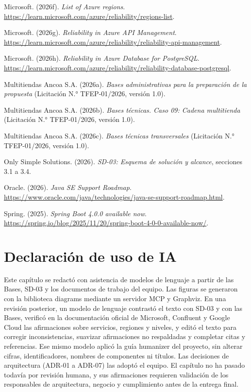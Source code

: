 \documentclass[11pt]{article}
\begin{document}
Microsoft. (2026f). \textit{List of Azure regions}. \url{https://learn.microsoft.com/azure/reliability/regions-list}.

Microsoft. (2026g). \textit{Reliability in Azure API Management}. \url{https://learn.microsoft.com/azure/reliability/reliability-api-management}.

Microsoft. (2026h). \textit{Reliability in Azure Database for PostgreSQL}. \url{https://learn.microsoft.com/azure/reliability/reliability-database-postgresql}.

Multitiendas Ancoa S.A. (2026a). \textit{Bases administrativas para la preparación de la propuesta} (Licitación N.° TFEP-01/2026, versión 1.0).

Multitiendas Ancoa S.A. (2026b). \textit{Bases técnicas. Caso 09: Cadena multitienda} (Licitación N.° TFEP-01/2026, versión 1.0).

Multitiendas Ancoa S.A. (2026c). \textit{Bases técnicas transversales} (Licitación N.° TFEP-01/2026, versión 1.0).

Only Simple Solutions. (2026). \textit{SD-03: Esquema de solución y alcance}, secciones 3.1 a 3.4.

Oracle. (2026). \textit{Java SE Support Roadmap}. \url{https://www.oracle.com/java/technologies/java-se-support-roadmap.html}.

Spring. (2025). \textit{Spring Boot 4.0.0 available now}. \url{https://spring.io/blog/2025/11/20/spring-boot-4-0-0-available-now/}.

\section*{Declaración de uso de IA}

Este capítulo se redactó con asistencia de modelos de lenguaje a partir de las Bases, SD-03 y los documentos de trabajo del equipo. Las figuras se generaron con la biblioteca diagrams mediante un servidor MCP y Graphviz. En una revisión posterior, un modelo de lenguaje contrastó el texto con SD-03 y con las Bases, verificó en la documentación oficial de Microsoft, Confluent y Google Cloud las afirmaciones sobre servicios, regiones y niveles, y editó el texto para corregir inconsistencias, suavizar afirmaciones no respaldadas y completar citas y referencias. Ese mismo modelo aplicó la guía humanizer del proyecto, sin alterar cifras, identificadores, nombres de componentes ni títulos. Las decisiones de arquitectura (ADR-01 a ADR-07) las adoptó el equipo. El capítulo no ha pasado todavía por revisión humana, y sus afirmaciones requieren validación de los responsables de arquitectura, negocio y cumplimiento antes de la entrega final.

\ossFinalPage
\end{document}
